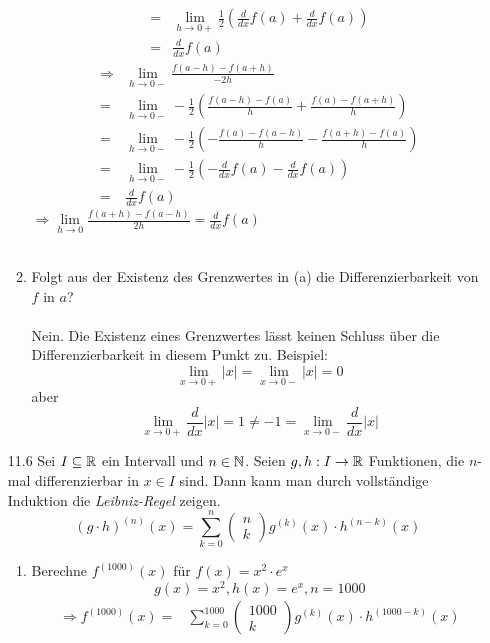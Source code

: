 \documentclass{HM}
\begin{document}
\begin{enumerate}
\begin{enumerate}
\begin{align*}
	=&\lim\limits_{h\to 0+}\frac{1}{2}\left(\frac{d}{dx}f(a)+\frac{d}{dx}f(a)\right)\\
	=&\frac{d}{dx}f(a)
	\end{align*}
	\begin{align*}
	\Rightarrow&\lim\limits_{h\to 0-}\frac{f(a-h)-f(a+h)}{-2h}\\
	=&\lim\limits_{h\to 0-}-\frac{1}{2}\left(\frac{f(a-h)-f(a)}{h}+\frac{f(a)-f(a+h)}{h}\right)\\
	=&\lim\limits_{h\to 0-}-\frac{1}{2}\left(-\frac{f(a)-f(a-h)}{h}-\frac{f(a+h)-f(a)}{h}\right)\\
	=&\lim\limits_{h\to 0-}-\frac{1}{2}\left(-\frac{d}{dx}f(a)-\frac{d}{dx}f(a)\right)\\
	=&\frac{d}{dx}f(a)
	\end{align*}
	$\Rightarrow \lim\limits_{h\to 0}\frac{f(a+h)-f(a-h)}{2h}=\frac{d}{dx}f(a)$\\\\
	\item Folgt aus der Existenz des Grenzwertes in (a) die Differenzierbarkeit von $f$ in $a$?\\\\
	Nein. Die Existenz eines Grenzwertes lässt keinen Schluss über die Differenzierbarkeit in diesem Punkt zu. Beispiel:\\
	$$\lim\limits_{x\to 0+}|x|=\lim\limits_{x\to 0-}|x|=0$$
	aber $$\lim\limits_{x\to 0+}\frac{d}{dx}|x|=1\not=-1=\lim\limits_{x\to 0-}\frac{d}{dx}|x|$$
\end{enumerate}
\newpage
\item [11.6] Sei $I\subseteq\mathbb{R}$ ein Intervall und $n\in\mathbb{N}$. Seien $g,h:I\to\mathbb{R}$ Funktionen, die $n$-mal differenzierbar in $x\in I$ sind. Dann kann man durch vollständige Induktion die \textit{Leibniz-Regel} zeigen.
$$(g\cdot h)^{(n)}(x)=\sum\limits_{k=0}^n\begin{pmatrix}
n\\k
\end{pmatrix}g^{(k)}(x)\cdot h^{(n-k)}(x)$$
\begin{enumerate}
	\item Berechne $f^{(1000)}(x)$ für $f(x)=x^2\cdot e^x$\\
	$$g(x)=x^2, h(x)=e^x, n=1000$$
	\begin{align*}
	\Rightarrow f^{(1000)}(x)=&\sum\limits_{k=0}^{1000}\begin{pmatrix}
1000\\k
\end{pmatrix} g^{(k)}(x)\cdot h^{(1000-k)}(x)\\

\end{align*}
\end{enumerate}
\end{enumerate}
\end{document}
